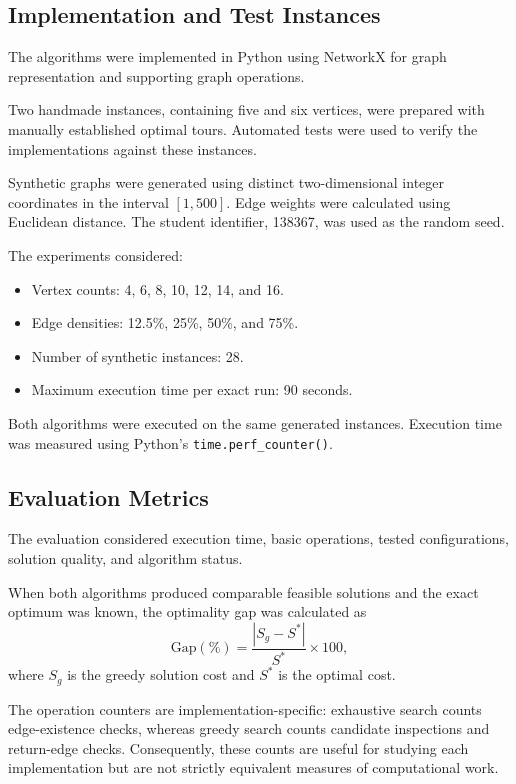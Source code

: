\documentclass[english,times,final,mirror,longpaper]{revdetua}
\begin{document}
\subsection{Implementation and Test Instances}

The algorithms were implemented in Python using NetworkX for graph
representation and supporting graph operations.

Two handmade instances, containing five and six vertices, were
prepared with manually established optimal tours. Automated tests
were used to verify the implementations against these instances.

Synthetic graphs were generated using distinct two-dimensional
integer coordinates in the interval $[1,500]$. Edge weights were
calculated using Euclidean distance. The student identifier, 138367,
was used as the random seed.

The experiments considered:
\begin{itemize}
\item Vertex counts: 4, 6, 8, 10, 12, 14, and 16.
\item Edge densities: 12.5\%, 25\%, 50\%, and 75\%.
\item Number of synthetic instances: 28.
\item Maximum execution time per exact run: 90 seconds.
\end{itemize}

Both algorithms were executed on the same generated instances.
Execution time was measured using Python's
\texttt{time.perf\_counter()}.

\subsection{Evaluation Metrics}

The evaluation considered execution time, basic operations,
tested configurations, solution quality, and algorithm status.

When both algorithms produced comparable feasible solutions and
the exact optimum was known, the optimality gap was calculated as
\[
\text{Gap}(\%)=
\frac{|S_g-S^*|}{S^*}\times100,
\]
where $S_g$ is the greedy solution cost and $S^*$ is the optimal cost.

The operation counters are implementation-specific: exhaustive
search counts edge-existence checks, whereas greedy search counts
candidate inspections and return-edge checks. Consequently, these
counts are useful for studying each implementation but are not
strictly equivalent measures of computational work.
\end{document}
